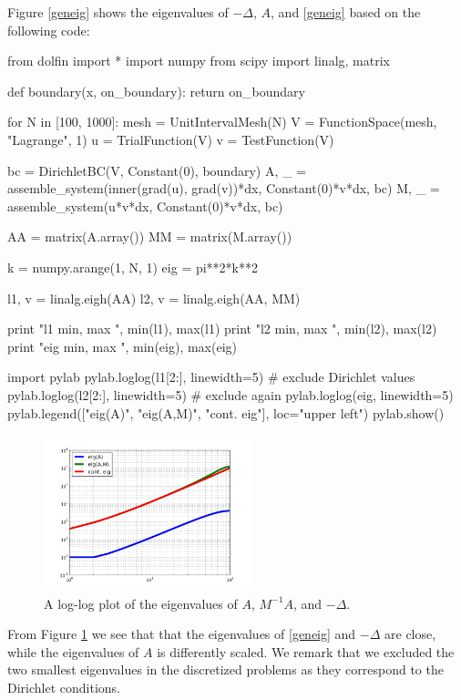 Figure \ref{geneig} shows the eigenvalues of $-\Delta$, $A$, and  
\eqref{geneig} based on the following code: 
\begin{python}
from dolfin import *
import numpy
from scipy import linalg, matrix

def boundary(x, on_boundary): return on_boundary

for N in [100, 1000]: 
  mesh = UnitIntervalMesh(N)
  V = FunctionSpace(mesh, "Lagrange", 1)
  u = TrialFunction(V)
  v = TestFunction(V)

  bc = DirichletBC(V, Constant(0), boundary)
  A, _ = assemble_system(inner(grad(u), grad(v))*dx, Constant(0)*v*dx, bc)
  M, _ = assemble_system(u*v*dx, Constant(0)*v*dx, bc)

  AA = matrix(A.array())
  MM = matrix(M.array())

  k = numpy.arange(1, N, 1)
  eig = pi**2*k**2 

  l1, v  = linalg.eigh(AA)
  l2, v  = linalg.eigh(AA, MM)

  print "l1 min, max ", min(l1), max(l1) 
  print "l2 min, max ", min(l2), max(l2) 
  print "eig min, max ", min(eig), max(eig) 

  import pylab 
  pylab.loglog(l1[2:], linewidth=5) # exclude Dirichlet values 
  pylab.loglog(l2[2:], linewidth=5) # exclude again 
  pylab.loglog(eig, linewidth=5)
  pylab.legend(["eig(A)", "eig(A,M)", "cont. eig"], loc="upper left")
  pylab.show()
\end{python}

\begin{figure}
\begin{center}
\includegraphics[width=6cm]{chapters/SobolevCrash/eig.png}
\caption{A log-log plot of the eigenvalues of $A$, $M^{-1} A$, and $-\Delta$. }  
\label{fig:geneig}
\end{center}
\end{figure}
From Figure \ref{fig:geneig} we see that that the eigenvalues
of \eqref{geneig} and $-\Delta$ are close, while the eigenvalues
of $A$ is differently scaled.  
We remark that we excluded the two smallest eigenvalues in the discretized problems 
as they correspond to the Dirichlet conditions. 


